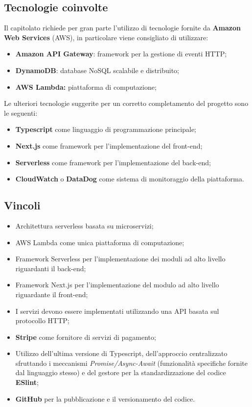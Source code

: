 \subsection{Tecnologie coinvolte}{
Il capitolato richiede per gran parte l'utilizzo di tecnologie fornite da \textbf{Amazon Web Services} (AWS), in particolare viene consigliato di utilizzare:
\begin{itemize}
\item \textbf{Amazon API Gateway}: framework per la gestione di eventi HTTP;
\item \textbf{DynamoDB}: database NoSQL scalabile e distribuito;
\item \textbf{AWS Lambda:} piattaforma di computazione;
\end{itemize}
Le ulteriori tecnologie suggerite per un corretto completamento del progetto sono le seguenti:
\begin{itemize}
\item \textbf{Typescript} come linguaggio di programmazione principale;
\item \textbf{Next.js} come framework per l'implementazione del front-end;
\item \textbf{Serverless} come framework per l'implementazione del back-end;
\item \textbf{CloudWatch} o \textbf{DataDog} come sistema di monitoraggio della piattaforma.
\end{itemize}
}

\subsection{Vincoli}{
\begin{itemize}
\item Architettura serverless basata su microservizi;
\item AWS Lambda come unica piattaforma di computazione;
\item Framework Serverless per l'implementazione dei moduli ad alto livello riguardanti il back-end;
\item Framework Next.js per l'implementazione del modulo ad alto livello riguardante il front-end;
\item I servizi devono essere implementati utilizzando una API basata sul protocollo HTTP;
\item \textbf{Stripe} come fornitore di servizi di pagamento;
\item Utilizzo dell'ultima versione di Typescript, dell'approccio centralizzato sfruttando i meccanismi \textit{Promise/Async-Await} (funzionalità specifiche fornite dal linguaggio stesso) e del gestore per la standardizzazione del codice \textbf{ESlint};
\item \textbf{GitHub} per la pubblicazione e il versionamento del codice.
\end{itemize}
}


